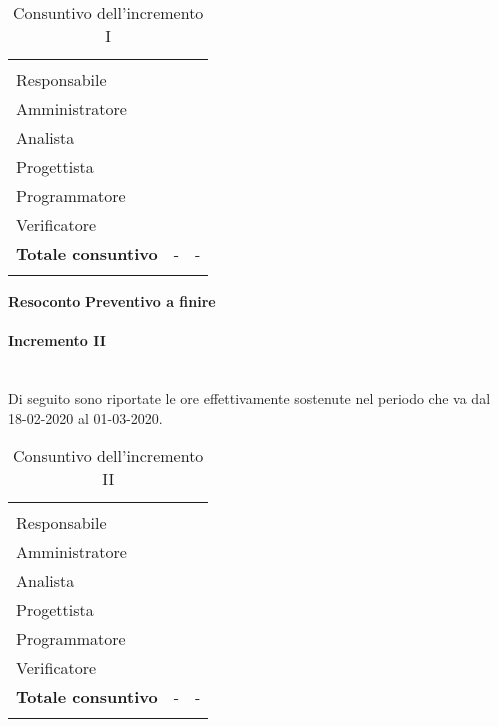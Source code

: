 \begin{longtable}{ C{4cm} C{3cm} C{3.5cm}} 
 	 &
 	 &
 	 \\
 	
 	Responsabile &  & \\
 	Amministratore &  & \\
 	Analista & & \\
 	Progettista & & \\
 	Programmatore & &\\
 	Verificatore & & \\
 	
	\hline 	
 	
 	\textbf{Totale consuntivo} &
	- \color{coloreRosso}{\textbf{(+--)}} &
 	- \\	
 	
 	\caption{Consuntivo dell'incremento I}
\end{longtable}

\textbf{Resoconto}
\textbf{Preventivo a finire}

\paragraph{Incremento II}\mbox{}\\
Di seguito sono riportate le ore effettivamente sostenute nel periodo che va dal 18-02-2020 al 01-03-2020.

\begin{longtable}{ C{4cm} C{3cm} C{3.5cm}} 
 	 &
 	 &
 	 \\
 	
 	Responsabile &  & \\
 	Amministratore &  & \\
 	Analista & & \\
 	Progettista & & \\
 	Programmatore & &\\
 	Verificatore & & \\
 	
	\hline 	
 	
 	\textbf{Totale consuntivo} &
	- \color{coloreRosso}{\textbf{(+--)}} &
 	- \\	
 	
 	\caption{Consuntivo dell'incremento II}
\end{longtable}

